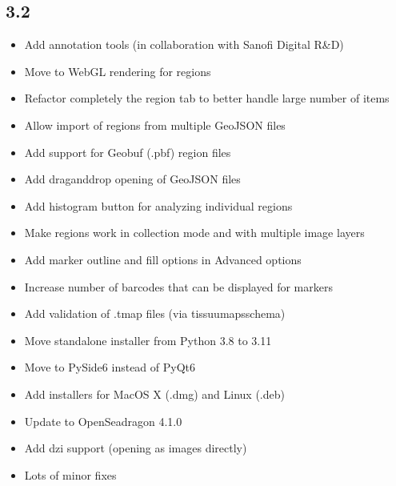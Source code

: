 \documentclass[letterpaper,10pt,english,openany,oneside]{sphinxmanual}
\begin{document}
\subsection{3.2}
\label{\detokenize{docs/intro/versions:id9}}\begin{itemize}
\item {} 
\sphinxAtStartPar
Add annotation tools (in collaboration with Sanofi Digital R\&D)

\item {} 
\sphinxAtStartPar
Move to WebGL rendering for regions

\item {} 
\sphinxAtStartPar
Refactor completely the region tab to better handle large number of items

\item {} 
\sphinxAtStartPar
Allow import of regions from multiple GeoJSON files

\item {} 
\sphinxAtStartPar
Add support for Geobuf (.pbf) region files

\item {} 
\sphinxAtStartPar
Add drag\sphinxhyphen{}and\sphinxhyphen{}drop opening of GeoJSON files

\item {} 
\sphinxAtStartPar
Add histogram button for analyzing individual regions

\item {} 
\sphinxAtStartPar
Make regions work in collection mode and with multiple image layers

\item {} 
\sphinxAtStartPar
Add marker outline and fill options in Advanced options

\item {} 
\sphinxAtStartPar
Increase number of barcodes that can be displayed for markers

\item {} 
\sphinxAtStartPar
Add validation of .tmap files (via tissuumaps\sphinxhyphen{}schema)

\item {} 
\sphinxAtStartPar
Move standalone installer from Python 3.8 to 3.11

\item {} 
\sphinxAtStartPar
Move to PySide6 instead of PyQt6

\item {} 
\sphinxAtStartPar
Add installers for MacOS X (.dmg) and Linux (.deb)

\item {} 
\sphinxAtStartPar
Update to OpenSeadragon 4.1.0

\item {} 
\sphinxAtStartPar
Add dzi support (opening as images directly)

\item {} 
\sphinxAtStartPar
Lots of minor fixes

\end{itemize}
\end{document}
